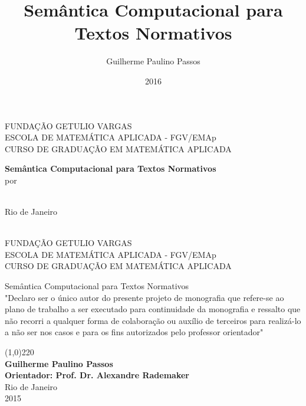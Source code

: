 \documentclass[12pt, a4paper, twoside]{article}
\title{Semântica Computacional para Textos Normativos} \newcommand{\usetitle}{Semântica Computacional para Textos Normativos}
\author{Guilherme Paulino Passos} \newcommand{\useauthor}{\Guilherme Paulino Passos}
\date{2016}
\newcommand{\supervisor}{Alexandre Rademaker}
\begin{document}
\begin{titlepage}
 \begin{center}
  { \large FUNDAÇÃO GETULIO VARGAS}\\[0.3cm]
  { \large ESCOLA DE MATEMÁTICA APLICADA - FGV/EMAp}\\[0.5cm]
  { \large CURSO DE GRADUAÇÃO EM MATEMÁTICA APLICADA}\\[0.3cm]
 
  \vspace{55 mm}

  {\bf \large Semântica Computacional para Textos Normativos}\\[1.2cm]

  { por}\\[0.6cm]
  {\large {\theauthor}}\\[0.1cm]


  \vspace{7cm}

  { Rio de Janeiro}\\[0.1cm]
  {\thedate}\\[0.6cm]
 \end{center}
\end{titlepage}

\begin{titlepage}
 
 \begin{center}
  {\large FUNDAÇÃO GETULIO VARGAS}\\[0.3cm]
  {\large ESCOLA DE MATEMÁTICA APLICADA - FGV/EMAp}\\[0.5cm]
  {\large CURSO DE GRADUAÇÃO EM MATEMÁTICA APLICADA}\\[0.3cm]


  \vspace{20 mm}


  {\large Semântica Computacional para Textos Normativos}\\[2.1cm]

  
  "Declaro ser o único autor do presente projeto de monografia que refere-se ao
plano de trabalho a ser executado para continuidade da monografia e ressalto
que não recorri a qualquer forma de colaboração ou auxílio de terceiros para
realizá-lo a não ser nos casos e para os fins autorizados pelo professor orientador"

  \vspace{3.5cm}
  
  \line(1,0){220}\\[0.1cm]
  {\bf Guilherme Paulino Passos}\\[2cm]
  {\bf Orientador: Prof. Dr. \supervisor}\\[3cm]


  {Rio de Janeiro}\\[0.1cm]
  {2015}
 \end{center}
\end{titlepage}
\end{document}
